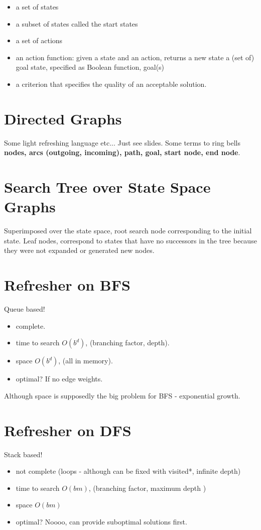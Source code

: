 \documentclass{article}
\begin{document}
\begin{itemize}
	\item a set of states
	\item a subset of states called the start states
	\item a set of actions
	\item an action function: given a state and an action, returns a new state a (set of) goal state, specified as Boolean function, goal(s)
	\item a criterion that specifies the quality of an acceptable solution.
\end{itemize}

\section{Directed Graphs}
Some light refreshing language etc... Just see slides. Some terms to ring bells \textbf{nodes, arcs (outgoing, incoming), path, goal, start node, end node}.

\section{Search Tree over State Space Graphs}
Superimposed over the state space, root search node corresponding to the initial state. Leaf nodes, correspond to states that have no successors in the tree because they were not expanded or generated new nodes.

\section{Refresher on BFS}
Queue based!

\begin{itemize}
	\item complete.
	\item time to search $O(b^d)$, (branching factor, depth).
	\item space $O(b^d)$, (all in memory).
	\item optimal? If no edge weights.
\end{itemize}

Although space is supposedly the big problem for BFS - exponential growth.

\section{Refresher on DFS}
Stack based!

\begin{itemize}
	\item not complete (loops - although can be fixed with visited*, infinite depth)
	\item time to search $O(bm)$, (branching factor, maximum depth ) 
	\item space $O(bm)$
	\item optimal? Noooo, can provide suboptimal solutions first.
\end{itemize}
\end{document}
